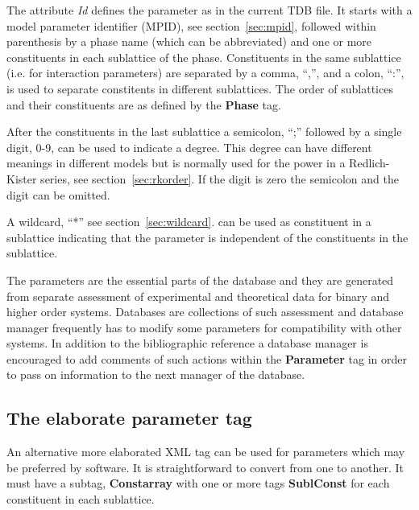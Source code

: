 \documentclass{article}
\begin{document}
The attribute {\em Id} defines the parameter as in the current TDB
file.  It starts with a model parameter identifier (MPID), see
section~\ref{sec:mpid}, followed within parenthesis by a phase name
(which can be abbreviated) and one or more constituents in each
sublattice of the phase.  Constituents in the same sublattice (i.e.
for interaction parameters) are separated by a comma, ``,'', and a
colon, ``:'', is used to separate constitents in different
sublattices.  The order of sublattices and their constituents are as
defined by the {\bf Phase} tag.

After the constituents in the last sublattice a semicolon, ``;''
followed by a single digit, 0-9, can be used to indicate a degree.
This degree can have different meanings in different models but is
normally used for the power in a Redlich-Kister series, see
section~\ref{sec:rkorder}.  If the digit is zero the semicolon and the
digit can be omitted.

A wildcard, ``*'' see section~\ref{sec:wildcard}. can be used as
constituent in a sublattice indicating that the parameter is
independent of the constituents in the sublattice.

The parameters are the essential parts of the database and they are
generated from separate assessment of experimental and theoretical
data for binary and higher order systems.  Databases are collections
of such assessment and database manager frequently has to modify some
parameters for compatibility with other systems.  In addition to the
bibliographic reference a database manager is encouraged to add
comments of such actions within the {\bf Parameter} tag in order to
pass on information to the next manager of the database.


\subsection{The elaborate parameter tag}\label{sec:parameter2}

An alternative more elaborated XML tag can be used for parameters
which may be preferred by software.  It is straightforward to convert
from one to another.  It must have a subtag, {\bf Constarray} with one
or more tags {\bf SublConst} for each constituent in each sublattice.
\end{document}
